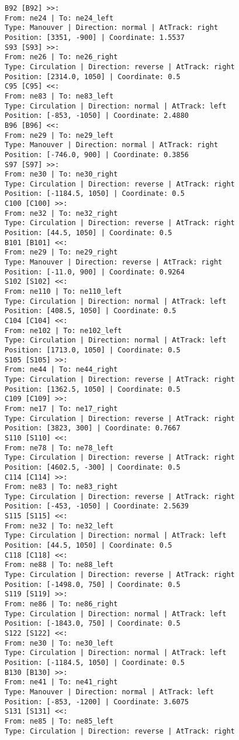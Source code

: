 \begin{lstlisting}[language = {}, tabsize=4, basicstyle=\footnotesize\ttfamily, showspaces=false, showstringspaces=false, caption = Signalling.RNA, label = {lst:EJ3_6}]
B92 [B92] >>:
From: ne24 | To: ne24_left
Type: Manouver | Direction: normal | AtTrack: right 
Position: [3351, -900] | Coordinate: 1.5537
S93 [S93] >>:
From: ne26 | To: ne26_right
Type: Circulation | Direction: reverse | AtTrack: right 
Position: [2314.0, 1050] | Coordinate: 0.5
C95 [C95] <<:
From: ne83 | To: ne83_left
Type: Circulation | Direction: normal | AtTrack: left 
Position: [-853, -1050] | Coordinate: 2.4880
B96 [B96] <<:
From: ne29 | To: ne29_left
Type: Manouver | Direction: normal | AtTrack: right 
Position: [-746.0, 900] | Coordinate: 0.3856
S97 [S97] >>:
From: ne30 | To: ne30_right
Type: Circulation | Direction: reverse | AtTrack: right 
Position: [-1184.5, 1050] | Coordinate: 0.5
C100 [C100] >>:
From: ne32 | To: ne32_right
Type: Circulation | Direction: reverse | AtTrack: right 
Position: [44.5, 1050] | Coordinate: 0.5
B101 [B101] <<:
From: ne29 | To: ne29_right
Type: Manouver | Direction: reverse | AtTrack: right 
Position: [-11.0, 900] | Coordinate: 0.9264
S102 [S102] <<:
From: ne110 | To: ne110_left
Type: Circulation | Direction: normal | AtTrack: left 
Position: [408.5, 1050] | Coordinate: 0.5
C104 [C104] <<:
From: ne102 | To: ne102_left
Type: Circulation | Direction: normal | AtTrack: left 
Position: [1713.0, 1050] | Coordinate: 0.5
S105 [S105] >>:
From: ne44 | To: ne44_right
Type: Circulation | Direction: reverse | AtTrack: right 
Position: [1362.5, 1050] | Coordinate: 0.5
C109 [C109] >>:
From: ne17 | To: ne17_right
Type: Circulation | Direction: reverse | AtTrack: right 
Position: [3823, 300] | Coordinate: 0.7667
S110 [S110] <<:
From: ne78 | To: ne78_left
Type: Circulation | Direction: reverse | AtTrack: right 
Position: [4602.5, -300] | Coordinate: 0.5
C114 [C114] >>:
From: ne83 | To: ne83_right
Type: Circulation | Direction: reverse | AtTrack: right 
Position: [-453, -1050] | Coordinate: 2.5639
S115 [S115] <<:
From: ne32 | To: ne32_left
Type: Circulation | Direction: normal | AtTrack: left 
Position: [44.5, 1050] | Coordinate: 0.5
C118 [C118] <<:
From: ne88 | To: ne88_left
Type: Circulation | Direction: reverse | AtTrack: right 
Position: [-1498.0, 750] | Coordinate: 0.5
S119 [S119] >>:
From: ne86 | To: ne86_right
Type: Circulation | Direction: normal | AtTrack: left 
Position: [-1843.0, 750] | Coordinate: 0.5
S122 [S122] <<:
From: ne30 | To: ne30_left
Type: Circulation | Direction: normal | AtTrack: left 
Position: [-1184.5, 1050] | Coordinate: 0.5
B130 [B130] >>:
From: ne41 | To: ne41_right
Type: Manouver | Direction: normal | AtTrack: left 
Position: [-853, -1200] | Coordinate: 3.6075
S131 [S131] <<:
From: ne85 | To: ne85_left
Type: Circulation | Direction: reverse | AtTrack: right 

\end{lstlisting}
